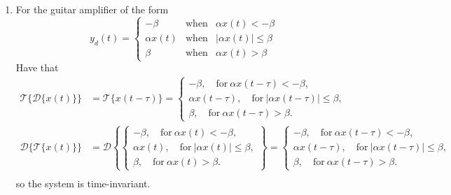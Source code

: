 \begin{enumerate}
\item For the guitar amplifier of the form
\begin{equation*}
y_d(t) = \left\{
  \begin{array}{rcr}
    -\beta & \mathrm{when} & \alpha x(t)<-\beta \\
    \alpha x(t) & \mathrm{when} & |\alpha x(t)| \le \beta \\
    \beta & \mathrm{when} & \alpha x(t)>\beta 
\end{array}
\right.
\end{equation*}
Have that
\begin{align*}
    \mathcal{T}\{\mathcal{D}\{x(t)\}\}&=\mathcal{T}\{x(t-\tau)\}=\begin{cases}
        -\beta, \quad \text{for}\ \alpha x(t-\tau)<-\beta,\\
        \alpha x(t-\tau), \quad \text{for}\ |\alpha x(t-\tau)|\le \beta,\\
        \beta, \quad \text{for}\ \alpha x(t-\tau)>\beta.
    \end{cases} \\
    \mathcal{D}\{\mathcal{T}\{x(t)\}\}&=\mathcal{D}\left\{\begin{cases}
        -\beta, \quad \text{for}\ \alpha x(t)<-\beta,\\
        \alpha x(t), \quad \text{for}\ |\alpha x(t)|\le \beta,\\
        \beta, \quad \text{for}\ \alpha x(t)>\beta.
    \end{cases}\right\}=\begin{cases}
        -\beta, \quad \text{for}\ \alpha x(t-\tau)<-\beta,\\
        \alpha x(t-\tau), \quad \text{for}\ |\alpha x(t-\tau)|\le \beta,\\
        \beta, \quad \text{for}\ \alpha x(t-\tau)>\beta.
    \end{cases} \\ 
\end{align*}
so the system is time-invariant. 


\end{enumerate}
